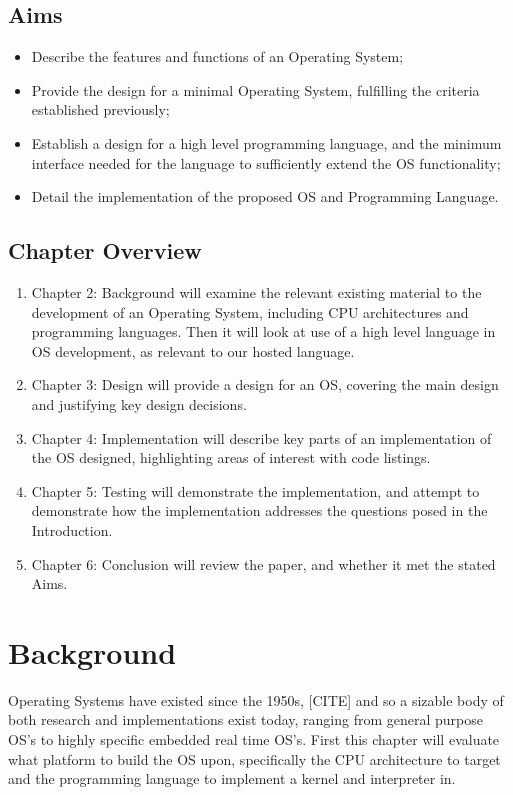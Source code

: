 \documentclass[11pt]{report}
\begin{document}
\section{Aims}
\begin{itemize}
\item Describe the features and functions of an Operating System;
\item Provide the design for a minimal Operating System, fulfilling the criteria established previously;
\item Establish a design for a high level programming language, and the minimum interface needed for the language to sufficiently extend the OS functionality;
\item Detail the implementation of the proposed OS and Programming Language.
\end{itemize}

\section{Chapter Overview}
\begin{enumerate}
\item Chapter 2: Background will examine the relevant existing material to the development of an Operating System, including CPU architectures and programming languages. Then it will look at use of a high level language in OS development, as relevant to our hosted language.
\item Chapter 3: Design will provide a design for an OS, covering the main design and justifying key design decisions.
\item Chapter 4: Implementation will describe key parts of an implementation of the OS designed, highlighting areas of interest with code listings.
\item Chapter 5: Testing will demonstrate the implementation, and attempt to demonstrate how the implementation addresses the questions posed in the Introduction.
\item Chapter 6: Conclusion will review the paper, and whether it met the stated Aims.
\end{enumerate}


\chapter{Background}

Operating Systems have existed since the 1950s, [CITE] and so a sizable body of both research and implementations exist today, ranging from general purpose OS's to highly specific embedded real time OS's. First this chapter will evaluate what platform to build the OS upon, specifically the CPU architecture to target and the programming language to implement a kernel and interpreter in.
\end{document}
